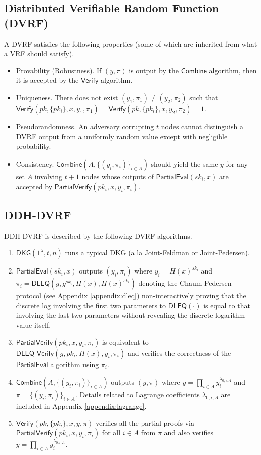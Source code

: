 \documentclass[letterpaper,twocolumn,10pt]{article}
\theoremstyle{definition}
\theoremstyle{remark}
\begin{document}
\subsection{Distributed Verifiable Random Function (DVRF)}
\label{appendix:dvrf}
A DVRF satisfies the following properties (some of which are inherited from what a VRF should satisfy).
\begin{itemize}
\item Provability (Robustness). If $(y, \pi)$ is output by the $\mathsf{Combine}$ algorithm, then it is accepted by the $\mathsf{Verify}$ algorithm.
\item Uniqueness. There does not exist $(y_1, \pi_1) \neq (y_2, \pi_2)$ such that $\mathsf{Verify}(pk, \{pk_i\}, x, y_1, \pi_1) = \mathsf{Verify}(pk, \{pk_i\}, x, y_2, \pi_2) = 1$.
\item Pseudorandomness. An adversary corrupting $t$ nodes cannot distinguish a DVRF output from a uniformly random value except with negligible probability.
\item Consistency. $\mathsf{Combine}(A, \{(y_i, \pi_i)\}_{i \in A})$ should yield the same $y$ for any set $A$ involving $t + 1$ nodes whose outputs of $\mathsf{PartialEval}(sk_i, x)$ are accepted by $\mathsf{PartialVerify}(pk_i, x, y_i, \pi_i)$.
\end{itemize}

\subsection{DDH-DVRF}
\label{appendix:ddh-dvrf}
DDH-DVRF is described by the following DVRF algorithms.
\begin{enumerate}
\item $\mathsf{DKG}(1^\lambda, t, n)$ runs a typical DKG (a la Joint-Feldman or Joint-Pedersen).
\item $\mathsf{PartialEval}(sk_i, x)$ outputs $(y_i, \pi_i)$ where $y_i = H(x)^{sk_i}$ and $\pi_i = \mathsf{DLEQ}(g, g^{sk_i}, H(x), H(x)^{sk_i})$ denoting the Chaum-Pedersen protocol (see Appendix \ref{appendix:dleq}) non-interactively proving that the discrete log involving the first two parameters to $\mathsf{DLEQ}(\cdot)$ is equal to that involving the last two parameters without revealing the discrete logarithm value itself.
\item $\mathsf{PartialVerify}(pk_i, x, y_i, \pi_i)$ is equivalent to $\mathsf{DLEQ}\text{-}\mathsf{Verify}(g, pk_i, H(x), y_i, \pi_i)$ and verifies the correctness of the $\mathsf{PartialEval}$ algorithm using $\pi_i$.
\item $\mathsf{Combine}(A, \{(y_i, \pi_i)\}_{i \in A})$ outputs $(y, \pi)$ where $y = \prod_{i \in A} y_i^{\lambda_{0, i, A}}$ and $\pi = \{(y_i, \pi_i)\}_{i \in A}$. Details related to Lagrange coefficients $\lambda_{0, i, A}$ are included in Appendix \ref{appendix:lagrange}.
\item $\mathsf{Verify}(pk, \{pk_i\}, x, y, \pi)$ verifies all the partial proofs via $\mathsf{PartialVerify}(pk_i, x, y_i, \pi_i)$ for all $i \in A$ from $\pi$ and also verifies $y = \prod_{i \in A} y_i^{\lambda_{0, i, A}}$.
\end{enumerate}
\end{document}
